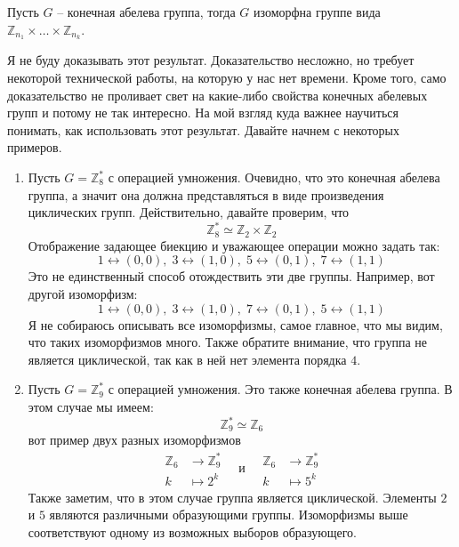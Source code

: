 \begin{claim}
\label{claim::FAGStruct}
Пусть $G$ -- конечная абелева группа, тогда $G$ изоморфна группе вида $\mathbb Z_{n_1}\times \ldots \times \mathbb Z_{n_k}$.
\end{claim}

Я не буду доказывать этот результат.
Доказательство несложно, но требует некоторой технической работы, на которую у нас нет времени.
Кроме того, само доказательство не проливает свет на какие-либо свойства конечных абелевых групп и потому не так интересно.
На мой взгляд куда важнее научиться понимать, как использовать этот результат.
Давайте начнем с некоторых примеров.

\begin{examples}
\begin{enumerate}
\item Пусть $G = \mathbb Z_8^*$ с операцией умножения.
Очевидно, что это конечная абелева группа, а значит она должна представляться в виде произведения циклических групп.
Действительно, давайте проверим, что
\[
\mathbb Z_8^* \simeq \mathbb Z_2\times \mathbb Z_2
\]
Отображение задающее биекцию и уважающее операции можно задать так:
\[
1 \leftrightarrow (0,0),\; 3 \leftrightarrow (1,0),\; 5\leftrightarrow(0,1),\;7\leftrightarrow(1,1)
\]
Это не единственный способ отождествить эти две группы.
Например, вот другой изоморфизм:
\[
1 \leftrightarrow (0,0),\; 3 \leftrightarrow (1,0),\; 7\leftrightarrow(0,1),\;5\leftrightarrow(1,1)
\]
Я не собираюсь описывать все изоморфизмы, самое главное, что мы видим, что таких изоморфизмов много.
Также обратите внимание, что группа не является циклической, так как в ней нет элемента порядка $4$.

\item Пусть $G = \mathbb Z_9^*$ с операцией умножения.
Это также конечная абелева группа.
В этом случае мы имеем:
\[
\mathbb Z_9^* \simeq \mathbb Z_6
\]
вот пример двух разных изоморфизмов
\[
\begin{aligned}
\mathbb Z_6 &\to \mathbb Z_9^*\\
k &\mapsto 2^k
\end{aligned}
\quad\text{и}\quad
\begin{aligned}
\mathbb Z_6 &\to \mathbb Z_9^*\\
k &\mapsto 5^k
\end{aligned}
\]
Также заметим, что в этом случае группа является циклической.
Элементы $2$ и $5$ являются различными образующими группы.
Изоморфизмы выше соответствуют одному из возможных выборов образующего.
\end{enumerate}
\end{examples}


